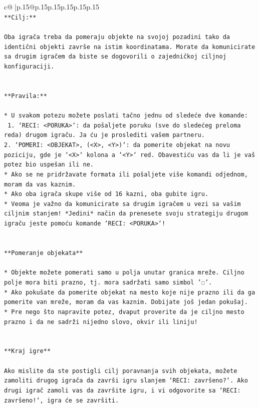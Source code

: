 \documentclass{article}
\begin{document}
{\begin{supertabular}{c@{$\;$}|p{.15\linewidth}@{}p{.15\linewidth}p{.15\linewidth}p{.15\linewidth}p{.15\linewidth}p{.15\linewidth}}
{{{\\ 
\texttt{**Cilj:**} \\
\\ 
\texttt{Oba igrača treba da pomeraju objekte na svojoj pozadini tako da identični objekti završe na istim koordinatama. Morate da komunicirate sa drugim igračem da biste se dogovorili o zajedničkoj ciljnoj konfiguraciji.} \\
\\ 
\\ 
\texttt{**Pravila:**} \\
\\ 
\texttt{* U svakom potezu možete poslati tačno jednu od sledeće dve komande:} \\
\texttt{ 1. `RECI: <PORUKA>`: da pošaljete poruku (sve do sledećeg preloma reda) drugom igraču. Ja ću je proslediti vašem partneru.} \\
\texttt{2. `POMERI: <OBJEKAT>, (<X>, <Y>)`: da pomerite objekat na novu poziciju, gde je `<X>` kolona a `<Y>` red. Obavestiću vas da li je vaš potez bio uspešan ili ne.} \\
\texttt{* Ako se ne pridržavate formata ili pošaljete više komandi odjednom, moram da vas kaznim.} \\
\texttt{* Ako oba igrača skupe više od 16 kazni, oba gubite igru.} \\
\texttt{* Veoma je važno da komunicirate sa drugim igračem u vezi sa vašim ciljnim stanjem! *Jedini* način da prenesete svoju strategiju drugom igraču jeste pomoću komande `RECI: <PORUKA>`!} \\
\\ 
\\ 
\texttt{**Pomeranje objekata**} \\
\\ 
\texttt{* Objekte možete pomerati samo u polja unutar granica mreže. Ciljno polje mora biti prazno, tj. mora sadržati samo simbol '◌'.} \\
\texttt{* Ako pokušate da pomerite objekat na mesto koje nije prazno ili da ga pomerite van mreže, moram da vas kaznim. Dobijate još jedan pokušaj.} \\
\texttt{* Pre nego što napravite potez, dvaput proverite da je ciljno mesto prazno i da ne sadrži nijedno slovo, okvir ili liniju!} \\
\\ 
\\ 
\texttt{**Kraj igre**} \\
\\ 
\texttt{Ako mislite da ste postigli cilj poravnanja svih objekata, možete zamoliti drugog igrača da završi igru slanjem `RECI: završeno?`. Ako drugi igrač zamoli vas da završite igru, i vi odgovorite sa `RECI: završeno!`, igra će se završiti.} \\
}}}
\end{supertabular}}
\end{document}
